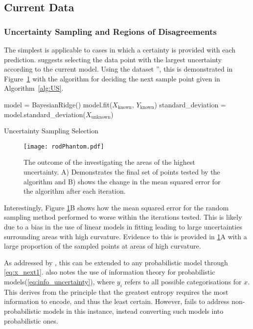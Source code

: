 \subsection{Current Data}

\subsubsection{Uncertainty Sampling and Regions of Disagreements}
\label{sec:Uncertainty Sampling}

The simplest is applicable to cases in which a certainty is provided with each prediction. \textcite{Set09} suggests selecting the data point with the largest uncertainty according to the current model. Using the dataset '', this is demonstrated in Figure~\ref{fig:rodPhantom} with the algorithm for deciding the next sample point given in Algorithm~\ref{alg:US}.

\begin{algorithm}[H]
  model = BayesianRidge()\;
  model.fit($X_\mathrm{known}$, $Y_\mathrm{known}$)\;
  standard\_deviation = model.standard\_deviation($X_\mathrm{unknown}$)\;
  \caption{Uncertainty Sampling Selection}
  \label{alg:US}\SetAlgoLined
\end{algorithm}


\begin{figure}[H]
  \begin{center}
    \texttt{[image: rodPhantom.pdf]}
    \caption[]{The outcome of the investigating the areas of the highest uncertainty. A) Demonstrates the final set of points tested by the algorithm and B) shows the change in the mean squared error for the algorithm after each iteration.}
    \label{fig:rodPhantom}
  \end{center}
\end{figure}
Interestingly, Figure \ref{fig:rodPhantom}B shows how the mean squared error for the random sampling method performed to worse within the iterations tested. This is likely due to a bias in the use of linear models in fitting leading to large uncertainties surrounding areas with high curvature. Evidence to this is provided in \ref{fig:rodPhantom}A with a large proportion of the sampled points at areas of high curvature.

As addressed by \textcite{Set09}, this can be extended to any probabilistic model through \ref{eq:x_next1}. \textcite{Set09} also notes the use of information theory for probabilistic models(\ref{eq:info_uncertainty}), where $y_i$ refers to all possible categorisations for $x$. This derives from the principle that the greatest entropy requires the most information to encode, and thus the least certain. However, \textcite{Set09} fails to address non-probabilistic models in this instance, instead converting such models into probabilistic ones.

